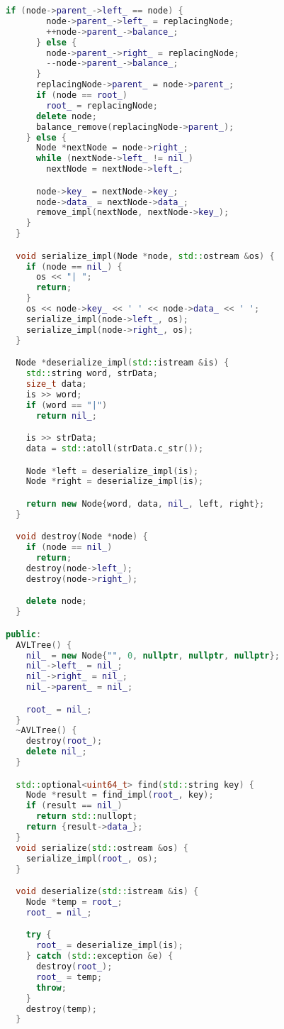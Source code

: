 \begin{lstlisting}[language=C++]
      if (node->parent_->left_ == node) {
        node->parent_->left_ = replacingNode;
        ++node->parent_->balance_;
      } else {
        node->parent_->right_ = replacingNode;
        --node->parent_->balance_;
      }
      replacingNode->parent_ = node->parent_;
      if (node == root_)
        root_ = replacingNode;
      delete node;
      balance_remove(replacingNode->parent_);
    } else {
      Node *nextNode = node->right_;
      while (nextNode->left_ != nil_)
        nextNode = nextNode->left_;

      node->key_ = nextNode->key_;
      node->data_ = nextNode->data_;
      remove_impl(nextNode, nextNode->key_);
    }
  }

  void serialize_impl(Node *node, std::ostream &os) {
    if (node == nil_) {
      os << "| ";
      return;
    }
    os << node->key_ << ' ' << node->data_ << ' ';
    serialize_impl(node->left_, os);
    serialize_impl(node->right_, os);
  }

  Node *deserialize_impl(std::istream &is) {
    std::string word, strData;
    size_t data;
    is >> word;
    if (word == "|")
      return nil_;

    is >> strData;
    data = std::atoll(strData.c_str());

    Node *left = deserialize_impl(is);
    Node *right = deserialize_impl(is);

    return new Node{word, data, nil_, left, right};
  }

  void destroy(Node *node) {
    if (node == nil_)
      return;
    destroy(node->left_);
    destroy(node->right_);

    delete node;
  }

public:
  AVLTree() {
    nil_ = new Node{"", 0, nullptr, nullptr, nullptr};
    nil_->left_ = nil_;
    nil_->right_ = nil_;
    nil_->parent_ = nil_;

    root_ = nil_;
  }
  ~AVLTree() {
    destroy(root_);
    delete nil_;
  }

  std::optional<uint64_t> find(std::string key) {
    Node *result = find_impl(root_, key);
    if (result == nil_)
      return std::nullopt;
    return {result->data_};
  }
  void serialize(std::ostream &os) { 
    serialize_impl(root_, os); 
  }

  void deserialize(std::istream &is) {
    Node *temp = root_;
    root_ = nil_;

    try {
      root_ = deserialize_impl(is);
    } catch (std::exception &e) {
      destroy(root_);
      root_ = temp;
      throw;
    }
    destroy(temp);
  }


\end{lstlisting}
